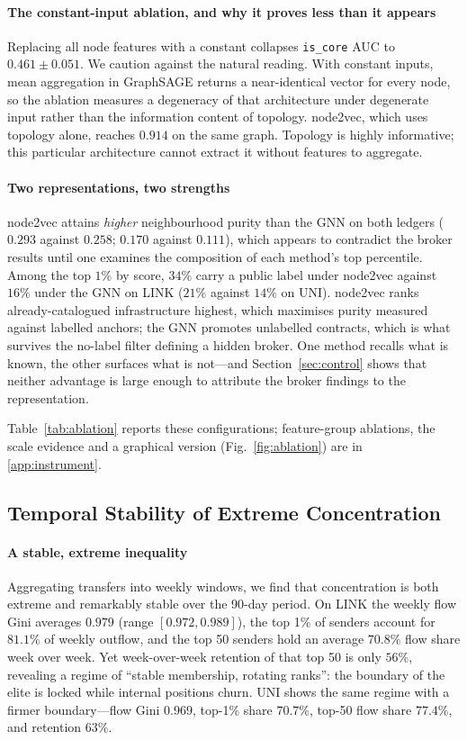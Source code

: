 \documentclass[final,5p,times]{elsarticle}
\begin{document}
\paragraph{The constant-input ablation, and why it proves less than it
appears} Replacing all node features with a constant collapses
\texttt{is\_core} AUC to $0.461 \pm 0.051$. We caution against the natural
reading. With constant inputs, mean aggregation in GraphSAGE returns a
near-identical vector for every node, so the ablation measures a degeneracy
of that architecture under degenerate input rather than the information
content of topology. node2vec, which uses topology alone, reaches $0.914$ on
the same graph. Topology is highly informative; this particular
architecture cannot extract it without features to aggregate.

\paragraph{Two representations, two strengths}
node2vec attains \emph{higher} neighbourhood purity than the GNN on both
ledgers ($0.293$ against $0.258$; $0.170$ against $0.111$), which appears to
contradict the broker results until one examines the composition of each
method's top percentile. Among the top $1\%$ by score, $34\%$ carry a public
label under node2vec against $16\%$ under the GNN on LINK ($21\%$ against
$14\%$ on UNI). node2vec ranks already-catalogued infrastructure highest,
which maximises purity measured against labelled anchors; the GNN promotes
unlabelled contracts, which is what survives the no-label filter defining a
hidden broker. One method recalls what is known, the other surfaces what is
not---and Section~\ref{sec:control} shows that neither advantage is large
enough to attribute the broker findings to the representation.

Table~\ref{tab:ablation} reports these configurations; feature-group
ablations, the scale evidence and a graphical version
(Fig.~\ref{fig:ablation}) are in \ref{app:instrument}.

\subsection{Temporal Stability of Extreme Concentration}
\label{sec:c2}

\paragraph{A stable, extreme inequality}
Aggregating transfers into weekly windows, we find that concentration is
both extreme and remarkably stable over the 90-day period. On LINK the
weekly flow Gini averages $0.979$ (range $[0.972, 0.989]$), the top 1\% of
senders account for $81.1\%$ of weekly outflow, and the top 50 senders hold
an average $70.8\%$ flow share week over week. Yet week-over-week retention
of that top 50 is only $56\%$, revealing a regime of ``stable membership,
rotating ranks'': the boundary of the elite is locked while internal
positions churn. UNI shows the same regime with a firmer boundary---flow
Gini $0.969$, top-1\% share $70.7\%$, top-50 flow share $77.4\%$, and
retention $63\%$.
\end{document}
